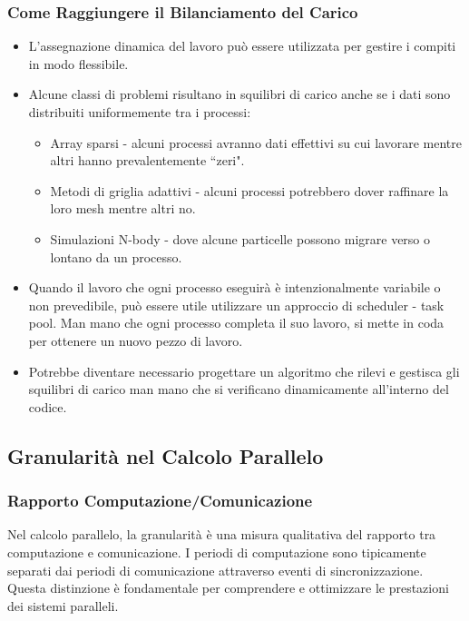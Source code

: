 \subsubsection{Come Raggiungere il Bilanciamento del Carico}
\begin{itemize}
    \item L'assegnazione dinamica del lavoro può
    essere utilizzata per gestire i compiti in modo
    flessibile.
    \item Alcune classi di problemi risultano in squilibri
    di carico anche se i dati sono distribuiti
    uniformemente tra i processi:
    \begin{itemize}
        \item Array sparsi - alcuni processi avranno dati
        effettivi su cui lavorare mentre altri hanno
        prevalentemente ``zeri".
        \item Metodi di griglia adattivi - alcuni processi
        potrebbero dover raffinare la loro mesh mentre
        altri no.
        \item Simulazioni N-body - dove alcune particelle
        possono migrare verso o lontano da un processo.
    \end{itemize}
    \item Quando il lavoro che ogni processo eseguirà
    è intenzionalmente variabile o non prevedibile, può
    essere utile utilizzare un approccio di scheduler -
    task pool. Man mano che ogni processo completa il suo
    lavoro, si mette in coda per ottenere un nuovo pezzo
    di lavoro.
    \item Potrebbe diventare necessario progettare un
    algoritmo che rilevi e gestisca gli squilibri di
    carico man mano che si verificano dinamicamente
    all'interno del codice.
\end{itemize}

\subsection{Granularità nel Calcolo Parallelo}

\subsubsection{Rapporto Computazione/Comunicazione}
Nel calcolo parallelo, la granularità è una misura
qualitativa del rapporto tra computazione e comunicazione.
I periodi di computazione sono tipicamente separati dai
periodi di comunicazione attraverso eventi di
sincronizzazione. Questa distinzione è fondamentale
per comprendere e ottimizzare le prestazioni dei sistemi
paralleli.

